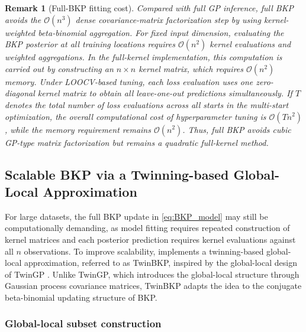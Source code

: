 \documentclass[article, shortnames]{jss}
\newtheorem{remark}{Remark}
\begin{document}
\begin{remark}[Full-BKP fitting cost]
	Compared with full GP inference, full BKP avoids the $\mathcal{O}(n^3)$ dense covariance-matrix factorization step by using kernel-weighted beta-binomial aggregation. 
	For fixed input dimension, evaluating the BKP posterior at all training locations requires $\mathcal{O}(n^2)$ kernel evaluations and weighted aggregations. 
	In the full-kernel implementation, this computation is carried out by constructing an $n\times n$ kernel matrix, which requires $\mathcal{O}(n^2)$ memory. 
	Under LOOCV-based tuning, each loss evaluation uses one zero-diagonal kernel matrix to obtain all leave-one-out predictions simultaneously. 
	If $T$ denotes the total number of loss evaluations across all starts in the multi-start optimization, the overall computational cost of hyperparameter tuning is $\mathcal{O}(Tn^2)$, while the memory requirement remains $\mathcal{O}(n^2)$. 
	Thus, full BKP avoids cubic GP-type matrix factorization but remains a quadratic full-kernel method.
\end{remark}

\subsection{Scalable BKP via a Twinning-based Global-Local Approximation}\label{sec:TwinBKP}

For large datasets, the full BKP update in \eqref{eq:BKP_model} may still be computationally demanding, as model fitting requires repeated construction of kernel matrices and each posterior prediction requires kernel evaluations against all $n$ observations.
To improve scalability,  implements a twinning-based global-local approximation, referred to as TwinBKP, inspired by the global-local design of TwinGP \citep{Vakayil2024TwinGP}. 
Unlike TwinGP, which introduces the global-local structure through Gaussian process covariance matrices, TwinBKP adapts the idea to the conjugate beta-binomial updating structure of BKP.

\subsubsection{Global-local subset construction}
\end{document}
